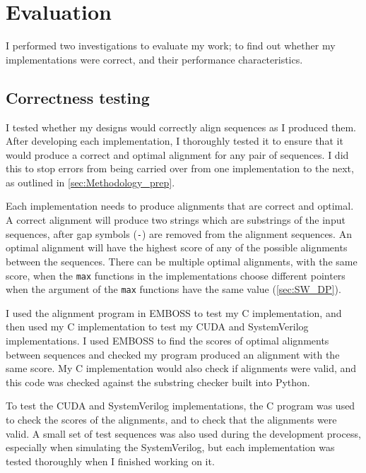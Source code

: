 
\chapter{Evaluation}
I performed two investigations to evaluate my work; to find out whether my implementations were correct, and their performance characteristics.

\section{Correctness testing}
\label{sec:Correctness_eval}

I tested whether my designs would correctly align sequences as I produced them.
After developing each implementation, I thoroughly tested it to ensure that it would produce a correct and optimal alignment for any pair of sequences.
I did this to stop errors from being carried over from one implementation to the next, as outlined in \cref{sec:Methodology_prep}.

Each implementation needs to produce alignments that are correct and optimal.
A correct alignment will produce two strings which are substrings of the input sequences, after gap symbols (\lstinline{-}) are removed from the alignment sequences.
An optimal alignment will have the highest score of any of the possible alignments between the sequences.
There can be multiple optimal alignments, with the same score, when the \lstinline{max} functions in the implementations choose different pointers when the argument of the \lstinline{max} functions have the same value (\cref{sec:SW_DP}).

I used the alignment program in EMBOSS \cite{EMBOSS} to test my C implementation, and then used my C implementation to test my CUDA and SystemVerilog implementations.
I used EMBOSS to find the scores of optimal alignments between sequences and checked my program produced an alignment with the same score.
My C implementation would also check if alignments were valid, and this code was checked against the substring checker built into Python.

To test the CUDA and SystemVerilog implementations, the C program was used to check the scores of the alignments, and to check that the alignments were valid.
A small set of test sequences was also used during the development process, especially when simulating the SystemVerilog, but each implementation was tested thoroughly when I finished working on it.

